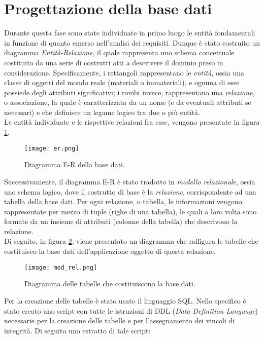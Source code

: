 \clearpage
\section{Progettazione della base dati}
Durante questa fase sono state individuate in primo luogo le entità fondamentali in funzione di quanto emerso nell'analisi dei requisiti. Dunque è stato costruito un diagramma \textit{Entità-Relazione}, il quale rappresenta uno schema concettuale costituito da una serie di costrutti atti a descrivere il dominio preso in considerazione. Specificamente, i rettangoli rappresentano le \textit{entità}, ossia una classe di oggetti del mondo reale (materiali o immateriali), e ognuna di esse possiede degli attributi significativi; i rombi invece, rappresentano una \textit{relazione}, o associazione, la quale è caratterizzata da un nome (e da eventuali attributi se necessari) e che definisce un legame logico tra due o più entità.\\
Le entità individuate e le rispettive relazioni fra esse, vengono presentate in figura \ref{fig:er}.

\begin{figure}[H]
	\centering
	\texttt{[image: er.png]}
	\caption{Diagramma E-R della base dati.}	
	\label{fig:er}
\end{figure}

\noindent 
Successivamente, il diagramma E-R è stato tradotto in \textit{modello relazionale}, ossia uno schema logico, dove il costrutto di base è la \textit{relazione}, corrispondente ad una tabella della base dati. Per ogni relazione, o tabella, le informazioni vengono rappresentate per mezzo di tuple (righe di una tabella), le quali a loro volta sono formate da un insieme di attributi (colonne della tabella) che descrivono la relazione.\\
Di seguito, in figura \ref{fig:mod_rel}, viene presentato un diagramma che raffigura le tabelle che costituisco la base dati dell'applicazione oggetto di questa relazione.

\begin{figure}[H]
	\centering
	\texttt{[image: mod\_rel.png]}
	\caption{Diagramma delle tabelle che costituiscono la base dati.}	
	\label{fig:mod_rel}
\end{figure}

Per la creazione delle tabelle è stato usato il linguaggio SQL. Nello specifico è stato creato uno script con tutte le istruzioni di DDL (\textit{Data Definition Language}) necessarie per la creazione delle tabelle e per l'assegnamento dei vincoli di integrità. Di seguito uno estratto di tale script:


